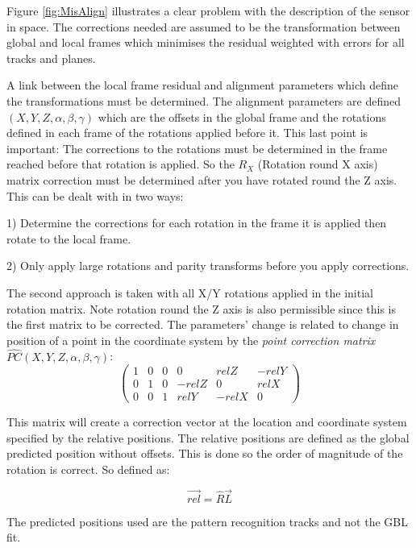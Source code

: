 Figure \ref{fig:MisAlign} illustrates a clear problem with the description of the sensor in space. The corrections needed are assumed to be the transformation between global and local frames which minimises the residual weighted with errors for all tracks and planes.

A link between the local frame residual and alignment parameters which define the transformations must be determined. The alignment parameters are defined $(X,Y,Z, \alpha,\beta,\gamma)$ which are the offsets in the global frame and the rotations defined in each frame of the rotations applied before it. This last point is important: The corrections to the rotations must be determined in the frame reached before that rotation is applied. So the $R_X$ (Rotation round X axis) matrix correction must be determined after you have rotated round the Z axis. This can be dealt with in two ways: 

1) Determine the corrections for each rotation in the frame it is applied then rotate to the local frame. 

2) Only apply large rotations and parity transforms before you apply corrections. 

The second approach is taken with all X/Y rotations applied in the initial rotation matrix. Note rotation round the Z axis is also permissible since this is the first matrix to be corrected. The parameters' change is related to change in position of a point in the coordinate system by the  \emph{point correction matrix} $\hat{PC}(X,Y,Z, \alpha,\beta,\gamma)$:
\[ \left( \begin{array}{cccccc}
1 & 0 & 0 & 0 & relZ & -relY \\
0 & 1 & 0 & -relZ & 0 & relX  \\
0 & 0 & 1 & relY & -relX & 0   
  \label{eq:PC}
\end{array}
 \right)\] 

This matrix will create a correction vector at the location and coordinate system specified by the relative positions. 
The relative positions are defined as the global predicted position without offsets. This is done so the order of magnitude of the rotation is correct. So defined as:

\begin{equation}
 \overrightarrow{rel} =   \hat{R}\overrightarrow{L} 
\end{equation}

The predicted positions used are the pattern recognition tracks and not the GBL fit.  

